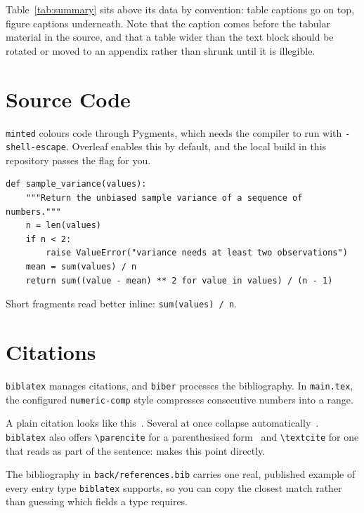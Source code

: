 Table~\ref{tab:summary} sits above its data by convention: table captions go on
top, figure captions underneath. Note that the caption comes before the
tabular material in the source, and that a table wider than the text block
should be rotated or moved to an appendix rather than shrunk until it is
illegible.

\section{Source Code}

\texttt{minted} colours code through Pygments, which needs the compiler to run
with \verb|-shell-escape|. Overleaf enables this by default, and the local
build in this repository passes the flag for you.

\begin{verbatim}
def sample_variance(values):
    """Return the unbiased sample variance of a sequence of numbers."""
    n = len(values)
    if n < 2:
        raise ValueError("variance needs at least two observations")
    mean = sum(values) / n
    return sum((value - mean) ** 2 for value in values) / (n - 1)
\end{verbatim}

Short fragments read better inline: \texttt{sum(values) / n}.

\section{Citations}

\texttt{biblatex} manages citations, and \texttt{biber} processes the
bibliography. In \texttt{main.tex}, the configured
\mbox{\texttt{numeric-comp}} style compresses consecutive numbers into a range.

A plain citation looks like this~\cite{warren1890}. Several at once collapse
automatically~\cite{said1978,fisher1936,vaswani2017}. \texttt{biblatex} also
offers \verb|\parencite| for a parenthesised form~\parencite{surgeongeneral1964}
and \verb|\textcite| for one that reads as part of the sentence:
\textcite{geertz1973} makes this point directly.

The bibliography in \texttt{back/references.bib} carries one real, published
example of every entry type \texttt{biblatex} supports, so you can copy the
closest match rather than guessing which fields a type requires.
